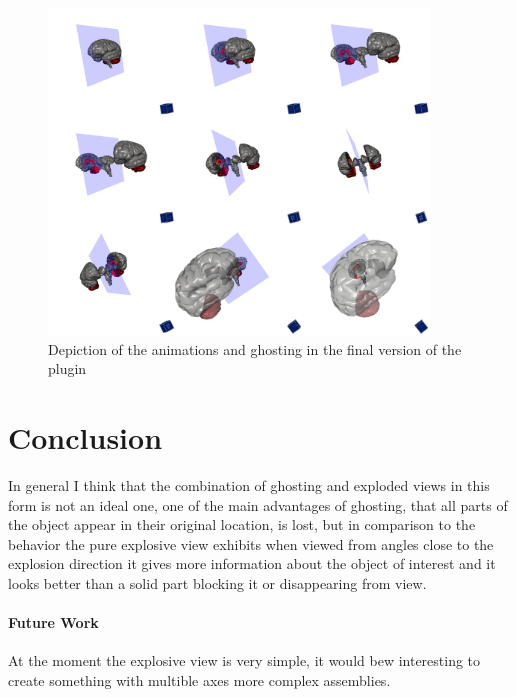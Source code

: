 \begin{figure}[tb]
	\centering
	\includegraphics[width=0.9\textwidth]{chapters/figures/brainstem}
	\caption{Depiction of the animations and ghosting in the final version of the plugin}
	\label{fig:brainstem}
\end{figure}
\chapter{Conclusion}
In general I think that the combination of ghosting and exploded views in this form is not an ideal one, one of the main advantages of ghosting, that all parts of the object appear in their original location, is lost, but in comparison to the behavior the pure explosive view exhibits when viewed from angles close to the explosion direction it gives more information about the object of interest and it looks better than a solid part blocking it or disappearing from view.
\subsubsection{Future Work}
At the moment the explosive view is very simple, it would bew interesting to create something with multible axes more complex assemblies.
